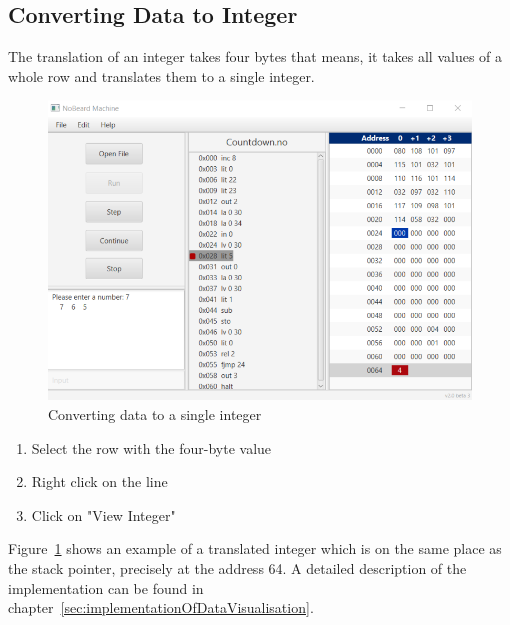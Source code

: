 \subsection{Converting Data to Integer}
The translation of an integer takes four bytes that means, it takes all values of a whole row and translates them to a single integer.  
\begin{figure}[h] 
	\centering
	\includegraphics[scale=.85]{images/screenshot-4.png}
	\caption{Converting data to a single integer}
	\label{fig:convertToInt}
\end{figure}
\begin{enumerate}
\item Select the row with the four-byte value 
\item Right click on the line
\item Click on "View Integer" 
\end{enumerate}
Figure~\ref{fig:convertToInt} shows an example of a translated integer which is on the same place as the stack pointer, precisely at the address 64. A detailed description of the implementation can be found in chapter~\ref{sec:implementationOfDataVisualisation}.
